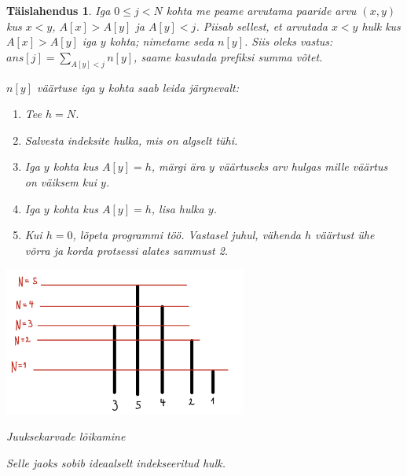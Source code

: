\documentclass{trkut}
\newtheorem*{solution}{Täislahendus}
\begin{document}
\begin{solution}
Iga $0≤j<N$ kohta me peame arvutama paaride arvu $(x,y)$ kus $x<y$,  $A[x]>A[y]$ ja $A[y]<j$. 
Piisab sellest, et arvutada $x<y$ hulk kus $A[x]>A[y]$ iga $y$ kohta; nimetame seda $n[y]$. 
Siis oleks vastus: $ans[j]=∑_{A[y]<j}n[y]$, saame kasutada prefiksi summa võtet.

$n[y]$ väärtuse iga $y$ kohta saab leida järgnevalt:
\begin{enumerate}
    \item  Tee $h=N$.
    \item   Salvesta indeksite hulka, mis on algselt tühi.
    \item  Iga $y$ kohta kus $A[y]=h$, märgi ära $y$ väärtuseks arv hulgas mille väärtus on väiksem kui $y$.
    \item  Iga $y$ kohta kus  $A[y]=h$, lisa hulka $y$.
    \item  Kui $h=0$, lõpeta programmi töö. Vastasel juhul, vähenda $h$ väärtust ühe võrra ja korda protsessi alates sammust 2.
\end{enumerate}

\begin{kk}[H]%
    \includegraphics[width=8cm]{jooned.png}%
    \caption{Juuksekarvade lõikamine}%
    \label{EMaxx}%
\end{kk}

Selle jaoks sobib ideaalselt indekseeritud hulk.
\end{solution}
\end{document}
